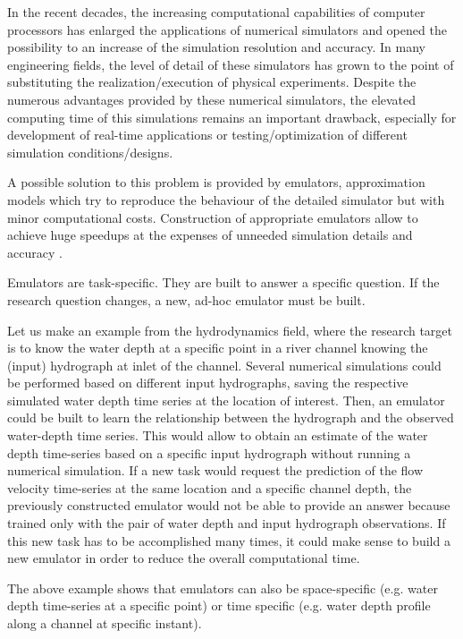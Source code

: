 
In the recent decades, the increasing computational capabilities of computer processors has enlarged the applications of numerical simulators and opened the possibility to an increase of the simulation resolution and accuracy. In many engineering fields, the level of detail of these simulators has grown to the point of substituting the realization/execution of physical experiments. 
Despite the numerous advantages provided by these numerical simulators, the elevated computing time of this simulations remains an important drawback, especially for development of real-time applications or testing/optimization of different simulation conditions/designs.  
 
A possible solution to this problem is provided by emulators, approximation models which try to reproduce the behaviour of the detailed simulator but with minor computational costs. Construction of appropriate emulators allow to achieve huge speedups at the expenses of unneeded simulation details and accuracy \autocite{carbajal_appraisal_2016}.

Emulators are task-specific. They are built to answer a specific question. If the research question changes, a new, ad-hoc emulator must be built.

Let us make an example from the hydrodynamics field, where the research target is to know the water depth at a specific point in a river channel knowing the (input) hydrograph at inlet of the channel. 
Several numerical simulations could be performed based on different input hydrographs, saving the respective simulated water depth time series at the location of interest. Then, an emulator could be built to learn the relationship between the hydrograph and the observed water-depth time series. This would allow to obtain an estimate of the water depth time-series based on a specific input hydrograph without running a numerical simulation. 
If a new task would request the prediction of the flow velocity time-series at the same location and a specific channel depth, the previously constructed emulator would not be able to provide an answer because trained only with the pair of water depth and input hydrograph observations. If this new task has to be accomplished many times, it could make sense to build a new emulator in order to reduce the overall computational time.

The above example shows that emulators can also be space-specific (e.g. water depth time-series at a specific point) or time specific (e.g. water depth profile along a channel at specific instant).

